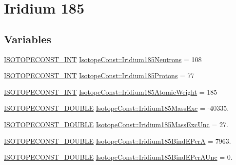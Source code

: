 \hypertarget{group___isotope_const-_iridium-_ir185}{}\section{Iridium 185}
\label{group___isotope_const-_iridium-_ir185}
\subsection*{Variables}
\begin{DoxyCompactItemize}
\item 
\mbox{\hyperlink{group___isotope_const-_macros_ga5f18360b3e99483a35c32d789e62621c}{I\+S\+O\+T\+O\+P\+E\+C\+O\+N\+S\+T\+\_\+\+I\+NT}} \mbox{\hyperlink{group___isotope_const-_iridium-_ir185_ga912575bf29e2b8af7a01f084369042ea}{Isotope\+Const\+::\+Iridium185\+Neutrons}} = 108
\item 
\mbox{\hyperlink{group___isotope_const-_macros_ga5f18360b3e99483a35c32d789e62621c}{I\+S\+O\+T\+O\+P\+E\+C\+O\+N\+S\+T\+\_\+\+I\+NT}} \mbox{\hyperlink{group___isotope_const-_iridium-_ir185_ga0a0a262ef07bf7117a38c11d5444ecd9}{Isotope\+Const\+::\+Iridium185\+Protons}} = 77
\item 
\mbox{\hyperlink{group___isotope_const-_macros_ga5f18360b3e99483a35c32d789e62621c}{I\+S\+O\+T\+O\+P\+E\+C\+O\+N\+S\+T\+\_\+\+I\+NT}} \mbox{\hyperlink{group___isotope_const-_iridium-_ir185_gae38be6812e398c94f2af53bb84f930d5}{Isotope\+Const\+::\+Iridium185\+Atomic\+Weight}} = 185
\item 
\mbox{\hyperlink{group___isotope_const-_macros_ga8f45a7272ce02c0b4c65c44636ed719a}{I\+S\+O\+T\+O\+P\+E\+C\+O\+N\+S\+T\+\_\+\+D\+O\+U\+B\+LE}} \mbox{\hyperlink{group___isotope_const-_iridium-_ir185_ga0054fe86ae10179c774255cd2c073a7a}{Isotope\+Const\+::\+Iridium185\+Mass\+Exc}} = -\/40335.
\item 
\mbox{\hyperlink{group___isotope_const-_macros_ga8f45a7272ce02c0b4c65c44636ed719a}{I\+S\+O\+T\+O\+P\+E\+C\+O\+N\+S\+T\+\_\+\+D\+O\+U\+B\+LE}} \mbox{\hyperlink{group___isotope_const-_iridium-_ir185_gac4392bc48dfd21f89875eedbfd08d9fa}{Isotope\+Const\+::\+Iridium185\+Mass\+Exc\+Unc}} = 27.
\item 
\mbox{\hyperlink{group___isotope_const-_macros_ga8f45a7272ce02c0b4c65c44636ed719a}{I\+S\+O\+T\+O\+P\+E\+C\+O\+N\+S\+T\+\_\+\+D\+O\+U\+B\+LE}} \mbox{\hyperlink{group___isotope_const-_iridium-_ir185_gabd73dd237848a741d09d4e41a93d46e4}{Isotope\+Const\+::\+Iridium185\+Bind\+E\+PerA}} = 7963.
\item 
\mbox{\hyperlink{group___isotope_const-_macros_ga8f45a7272ce02c0b4c65c44636ed719a}{I\+S\+O\+T\+O\+P\+E\+C\+O\+N\+S\+T\+\_\+\+D\+O\+U\+B\+LE}} \mbox{\hyperlink{group___isotope_const-_iridium-_ir185_ga0e9c1d839749ccf3a0b7699ffd7f9413}{Isotope\+Const\+::\+Iridium185\+Bind\+E\+Per\+A\+Unc}} = 0.

\end{DoxyCompactItemize}
